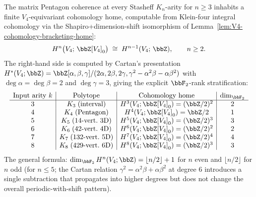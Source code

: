 \begin{theorem}
\label{thm:universal-Kn-tower-stratification}
The matrix Pentagon coherence at every Stasheff $K_n$-arity for $n \geq 3$
inhabits a finite $V_4$-equivariant cohomology home, computable from
Klein-four integral cohomology via the Shapiro+dimension-shift isomorphism
of Lemma~\ref{lem:V4-cohomology-bracketing-home}:
\[
 H^n\bigl(V_4;\, \bbZ[V_4]_0\bigr) \;\cong\; H^{n-1}(V_4;\, \bbZ),\qquad
 n \geq 2.
\]
The right-hand side is computed by Cartan's presentation
$H^*(V_4; \bbZ) = \bbZ[\alpha, \beta, \gamma]/(2\alpha, 2\beta, 2\gamma,
 \gamma^2 - \alpha^2\beta - \alpha\beta^2)$ with $\deg \alpha = \deg \beta = 2$
and $\deg \gamma = 3$, giving the explicit $\bbF_2$-rank stratification:
\[
 \begin{array}{c|c|c|c}
 \text{Input arity }k & \text{Polytope} & \text{Cohomology home} & \dim_{\bbF_2} \\
 \hline
 3 & K_3 \;(\text{interval}) & H^3(V_4; \bbZ[V_4]_0) = (\bbZ/2)^2 & 2 \\
 4 & K_4 \;(\text{Pentagon}) & H^4(V_4; \bbZ[V_4]_0) = \bbZ/2 & 1 \\
 5 & K_5 \;(\text{14-vert.\ 3D}) & H^5(V_4; \bbZ[V_4]_0) = (\bbZ/2)^3 & 3 \\
 6 & K_6 \;(\text{42-vert.\ 4D}) & H^6(V_4; \bbZ[V_4]_0) = (\bbZ/2)^2 & 2 \\
 7 & K_7 \;(\text{132-vert.\ 5D}) & H^7(V_4; \bbZ[V_4]_0) = (\bbZ/2)^4 & 4 \\
 8 & K_8 \;(\text{429-vert.\ 6D}) & H^8(V_4; \bbZ[V_4]_0) = (\bbZ/2)^3 & 3 \\
 \end{array}
\]
The general formula: $\dim_{\bbF_2} H^n(V_4; \bbZ) = \lfloor n/2 \rfloor + 1$
for $n$ even and $\lfloor n/2 \rfloor$ for $n$ odd \textup{(}for $n \leq 5$;
the Cartan relation $\gamma^2 = \alpha^2\beta + \alpha\beta^2$ at degree $6$
introduces a single subtraction that propagates into higher degrees but does
not change the overall periodic-with-shift pattern\textup{).}
\end{theorem}

